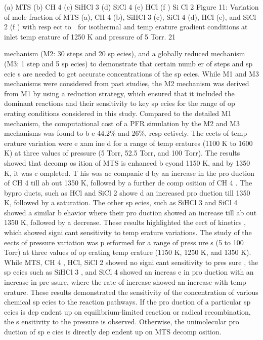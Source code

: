 \documentclass[10pt, letterpaper]{article}
\begin{document}
(a) MTS
(b) CH
4
(c) SiHCl
3
(d) SiCl
4
(e) HCl
(f ) Si Cl
2
Figure 11: Variation of mole fraction of MTS (a), CH
4
(b), SiHCl
3
(c), SiCl
4
(d), HCl (e), and SiCl
2
(f ) with resp ect to

for
isothermal and temp erature gradient conditions at inlet temp erature of 1250 K and pressure of 5 Torr.
21


mechanism (M2: 30 steps and 20 sp ecies), and a globally reduced mechanism (M3: 1 step and 5 sp ecies)
to demonstrate that certain numb er of steps and sp ecie s are needed to get accurate concentrations of the
sp ecies. While M1 and M3 mechanisms were considered from past studies, the M2 mechanism was derived
from M1 by using a reduction strategy, which ensured that it included the dominant reactions and their
sensitivity to key sp ecies for the range of op erating conditions considered in this study. Compared to the
detailed M1 mechanism, the computational cost of a PFR simulation by the M2 and M3 mechanisms was
found to b e 44.2\% and 26\%, resp ectively.
The eects of temp erature variation were e xam ine d for a range of temp eratures (1100 K to 1600 K) at
three values of pressure (5 Torr, 52.5 Torr, and 100 Torr). The results showed that decomp os ition of MTS
is enhanced b eyond 1150 K, and by 1350 K, it was c ompleted. T his was ac companie d by an increase in the
pro duction of CH
4
till ab out 1350 K, followed by a further de comp osition of CH
4
. The bypro ducts, such as
HCl and SiCl
2
showe d an increased pro duction till 1350 K, followed by a saturation. The other sp ecies, such
as SiHCl
3
and SiCl
4
showed a similar b ehavior where their pro duction showed an increase till ab out 1350 K,
followed by a decrease. These results highlighted the eect of kinetics , which showed signicant sensitivity
to temp erature variations.
The study of the eects of pressure variation was p erformed for a range of press ure s (5 to 100 Torr) at
three values of op erating temp erature (1150 K, 1250 K, and 1350 K). While MTS, CH
4
, HCl, SiCl
2
showed
no signicant sensitivity to pres sure , the sp ecies such as SiHCl
3
, and SiCl
4
showed an increas e in pro duction
with an increase in pre ssure, where the rate of increase showed an increase with temp erature. These results
demonstrated the sensitivity of the concentration of various chemical sp ecies to the reaction pathways. If the
pro duction of a particular sp ecies is dep endent up on equilibrium-limited reaction or radical recombination,
the s ensitivity to the pressure is observed. Otherwise, the unimolecular pro duction of sp e cies is directly
dep endent up on MTS decomp osition.
\end{document}
